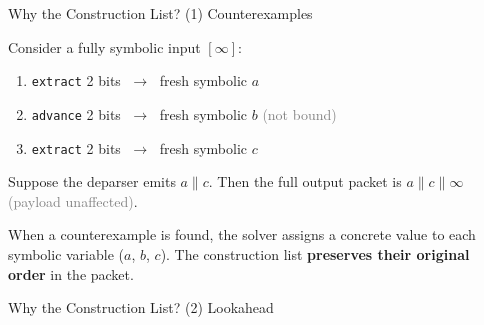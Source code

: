 \documentclass[aspectratio=169]{beamer}
\begin{document}
\begin{hidden}
\begin{frame}{Why the Construction List? \quad (1) Counterexamples}

  Consider a fully symbolic input $[\infty]$:

  \medskip
  \begin{enumerate}
    \item \texttt{extract} 2 bits $\;\to\;$ fresh symbolic $a$
    \item \texttt{advance} 2 bits $\;\to\;$ fresh symbolic $b$
          {\small\textcolor{gray}{(not bound)}}
    \item \texttt{extract} 2 bits $\;\to\;$ fresh symbolic $c$
  \end{enumerate}

  \bigskip
  \centering

  \bigskip
  \raggedright
  Suppose the deparser emits $a \mathbin{\|} c$. Then the full output packet is $ a \mathbin{\|} c \mathbin{\|}  \infty$
  {\small\textcolor{gray}{(payload unaffected)}}.

  \smallskip
  When a counterexample is found, the solver assigns a concrete value to
  each symbolic variable ($a$, $b$, $c$). The construction list
  \textbf{preserves their original order} in the packet.
\end{frame}

\begin{frame}{Why the Construction List? \quad (2) Lookahead}


\end{frame}
\end{hidden}
\end{document}
